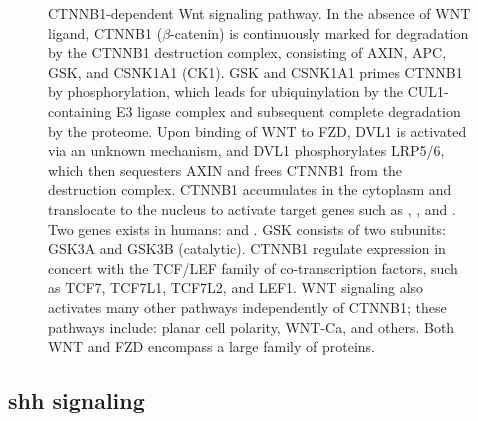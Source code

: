 \begin{figure}[H]
	\begin{center}
	\end{center}
	\caption[CTNNB1-dependent Wnt signaling pathway]
	{
		CTNNB1-dependent Wnt signaling pathway.
		In the absence of WNT ligand, CTNNB1 ($\beta$-catenin) is continuously marked for degradation by the CTNNB1 destruction complex, consisting of AXIN, APC, GSK, and CSNK1A1 (CK1). GSK and CSNK1A1 primes CTNNB1 by phosphorylation, which leads for ubiquinylation by the CUL1-containing E3 ligase complex and subsequent complete degradation by the proteome. Upon binding of WNT to FZD, DVL1 is activated via an unknown mechanism, and DVL1 phosphorylates LRP5/6, which then sequesters AXIN and frees CTNNB1 from the destruction complex. CTNNB1 accumulates in the cytoplasm and translocate to the nucleus to activate target genes such as , , and . Two  genes exists in humans:  and . GSK consists of two subunits: GSK3A and GSK3B (catalytic). CTNNB1 regulate expression in concert with the TCF/LEF family of co-transcription factors, such as TCF7, TCF7L1, TCF7L2, and LEF1. WNT signaling also activates many other pathways independently of CTNNB1; these pathways include: planar cell polarity, WNT-Ca, and others. Both WNT and FZD encompass a large family of proteins.
	}
	\label{fig:wnt-pathway}
\end{figure}


\subsection{\gls{shh} signaling}

